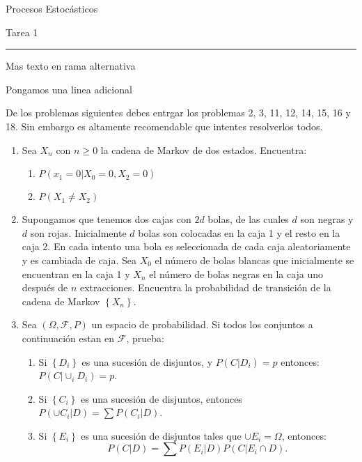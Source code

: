 \documentclass{report}
\begin{document}
\begin{center}
    \textsf{\Large Procesos Estocásticos}
    \par\medskip
    \textsf{\large Tarea 1}
\end{center}
\hrule
\par\bigskip
	Mas texto en rama alternativa
	
Pongamos una linea adicional

De los problemas siguientes debes entrgar los problemas 2, 3, 11, 12, 14, 15, 16 y 18. Sin embargo es altamente recomendable que intentes resolverlos todos.
\begin{enumerate}
    \item Sea $X_n$ con $n\geq 0$ la cadena de Markov de dos estados. Encuentra:
          \begin{enumerate}
              \item $P\left(\left. x_1=0\right\vert X_0=0, X_2=0\right)$
              \item $P\left(X_1\neq X_2\right)$
          \end{enumerate}
    \item Supongamos que tenemos dos cajas con $2d$ bolas, de las cuales $d$ son negras y $d$ son rojas. Inicialmente $d$ bolas son colocadas en la caja 1 y el resto en la caja 2. En cada intento una bola es seleccionada de cada caja aleatoriamente y es cambiada de caja. Sea $X_0$ el número de bolas blancas que inicialmente se encuentran en la caja 1 y $X_n$ el número de bolas negras en la caja uno después de $n$ extracciones. Encuentra la probabilidad de transición de la cadena de Markov $\left\{X_n\right\}$.
    \item Sea $\left(\Omega, \mathcal{F}, P\right)$ un espacio de probabilidad. Si todos los conjuntos a continuación estan en $\mathcal{F}$, prueba:
          \begin{enumerate}
              \item Si $\left\{D_i\right\}$ es una sucesión de disjuntos, y $P(\left.C\right\vert D_i)=p$ entonces: $P\left(\left. C \right\vert \cup_i D_i\right)=p$.
              \item Si $\left\{C_i\right\}$ es una sucesión de disjuntos, entonces $P\left(\left.\cup C_i\right\vert D\right)= \sum P\left(\left.C_i\right\vert D\right)$.
              \item Si $\left\{E_i\right\}$ es una sucesión de disjuntos tales que $\cup E_i = \Omega$, entonces:
                    $$
                        P\left(\left.C\right\vert D \right)= \sum P\left(\left.E_i\right\vert D\right)P\left(\left. C\right\vert E_i\cap D\right).
$$
\end{enumerate}
\end{enumerate}
\end{document}
